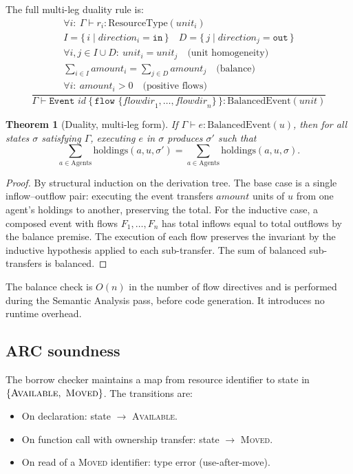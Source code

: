 \documentclass[11pt,a4paper]{article}
\newtheorem{theorem}{Theorem}[section]
\theoremstyle{remark}
\begin{document}
The full multi-leg duality rule is:
\[
\dfrac{
  \begin{array}{c}
    \forall i:\ \Gamma \vdash r_i : \mathrm{ResourceType}(unit_i) \\
    I = \{\, i \mid \mathit{direction}_i = \texttt{in}\,\} \quad
    D = \{\, j \mid \mathit{direction}_j = \texttt{out}\,\} \\
    \forall i,j \in I \cup D:\ unit_i = unit_j \quad \text{(unit homogeneity)} \\
    \sum_{i \in I} \mathit{amount}_i = \sum_{j \in D} \mathit{amount}_j \quad \text{(balance)} \\
    \forall i:\ \mathit{amount}_i > 0 \quad \text{(positive flows)}
  \end{array}
}{
  \Gamma \vdash \texttt{Event } id\ \{\, \texttt{flow }\{ \mathit{flowdir}_1, \dots, \mathit{flowdir}_n \}\,\} : \mathrm{BalancedEvent}(unit)
}
\]

\begin{theorem}[Duality, multi-leg form]\label{thm:duality-full}
If $\Gamma \vdash e : \mathrm{BalancedEvent}(u)$, then for all states
$\sigma$ satisfying $\Gamma$, executing $e$ in $\sigma$ produces
$\sigma'$ such that
\[
\sum_{a \in \mathrm{Agents}} \mathrm{holdings}(a, u, \sigma') =
\sum_{a \in \mathrm{Agents}} \mathrm{holdings}(a, u, \sigma).
\]
\end{theorem}

\begin{proof}
By structural induction on the derivation tree. The base case is a
single inflow--outflow pair: executing the event transfers
$\mathit{amount}$ units of $u$ from one agent's holdings to another,
preserving the total. For the inductive case, a composed event with
flows $F_1,\dots,F_n$ has total inflows equal to total outflows by the
balance premise. The execution of each flow preserves the invariant by
the inductive hypothesis applied to each sub-transfer. The sum of
balanced sub-transfers is balanced.
\end{proof}

The balance check is $O(n)$ in the number of flow directives and is
performed during the Semantic Analysis pass, before code generation. It
introduces no runtime overhead.

\subsection{ARC soundness}

The borrow checker maintains a map from resource identifier to state in
$\{\textsc{Available},\ \textsc{Moved}\}$. The transitions are:
\begin{itemize}\setlength{\itemsep}{0pt}
  \item On declaration: state $\to$ \textsc{Available}.
  \item On function call with ownership transfer: state $\to$ \textsc{Moved}.
  \item On read of a \textsc{Moved} identifier: type error (use-after-move).
\end{itemize}
\end{document}
